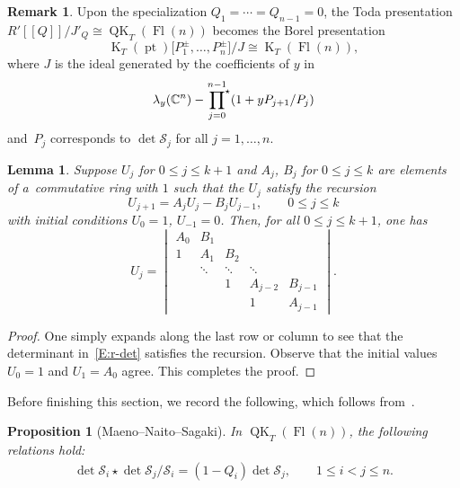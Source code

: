 \documentclass[pdftex]{sigma}
\numberwithin{equation}{section}
\newtheorem{Lemma}[Theorem]{Lemma}
\newtheorem{Proposition}[Theorem]{Proposition}
\theoremstyle{definition}
\newtheorem{Remark}[Theorem]{Remark}
\DeclareMathOperator{\Fl}{Fl}
\DeclareMathOperator{\QK}{QK}
\DeclareMathOperator{\K}{K}
\DeclareMathOperator{\pt}{pt}
\newcommand{\C}{{\mathbb C}}
\newcommand{\cS}{{\mathcal S}}
\begin{document}
 \begin{Remark}
 Upon the specialization $Q_1=\dotsm=Q_{n-1}=0$, the Toda presentation $R'[\![Q]\!]/J'_Q\cong\QK_T(\Fl(n))$ becomes the Borel presentation
 \[
 \K_T(\pt)\bigl[P_1^\pm,\dots,P_n^{\pm}\bigr]/J\cong \K_T(\Fl(n)),
 \]
 where $J$ is the ideal generated by the coefficients of $y$ in
 \[
 \lambda_y(\C^n)-\sideset{}{^\star}\prod_{j=0}^{n-1} (1+yP_{j+1}/P_j)
 \]
 and~$P_j$ corresponds to $\det \cS_j$ for all $j=1,\dots,n$.
 \end{Remark}
 \begin{Lemma}
 \label{L:r-det}
 Suppose $U_j$ for $0\le j\le k+1$ and $A_j$, $B_j$ for $0\le j\le k$ are elements of a~commutative ring with $1$ such that the $U_j$ satisfy the recursion
 \begin{equation*}
 U_{j+1}=A_jU_{j}-B_jU_{j-1},\qquad 0\le j\le k
 \end{equation*}
 with initial conditions $U_0=1$, $U_{-1}=0$. Then, for all $0\le j\le k+1$, one has
 \begin{equation}
 \label{E:r-det}
 U_j=
 \begin{vmatrix}
 A_0 & B_1 & & & \\
 1 & A_1 & B_2 & & \\
 & \ddots & \ddots & \ddots & \\
 & & 1 & A_{j-2} & B_{j-1}\\
 & & & 1 & A_{j-1}
 \end{vmatrix}.
 \end{equation}
 \end{Lemma}

 \begin{proof}
 One simply expands along the last row or column to see that the determinant in~\eqref{E:r-det} satisfies the recursion. Observe that the initial values $U_0=1$ and $U_1=A_0$ agree. This completes the proof.
 \end{proof}

 Before finishing this section, we record the following, which follows from~\cite[Proposition~5.2]{maeno.naito.sagaki:QKideal}.

 \begin{Proposition}[Maeno--Naito--Sagaki]\label{prop:MNS}
 In $\QK_T(\Fl(n))$, the following relations hold:
 \begin{gather*}
 \det \cS_i \star \det \cS_j/\cS_i = (1-Q_i) \det \cS_j, \qquad 1 \le i < j \le n.
 \end{gather*}
 \end{Proposition}
\end{document}
